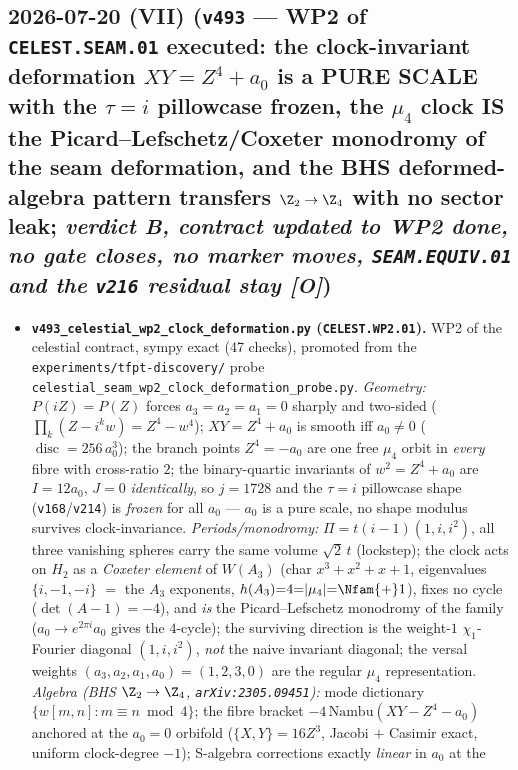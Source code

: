 \documentclass[11pt]{article}
\providecommand{\mO}{\textbf{[O]}}\providecommand{\mX}{\textbf{[X]}}
\begin{document}
\subsection*{2026-07-20 (VII) (\texttt{v493} --- WP2 of \texttt{CELEST.SEAM.01} executed: the clock-invariant deformation $XY{=}Z^4{+}a_0$ is a PURE SCALE with the $\tau{=}i$ pillowcase frozen, the $\mu_4$ clock IS the Picard--Lefschetz/Coxeter monodromy of the seam deformation, and the BHS deformed-algebra pattern transfers $\Z_2\to\Z_4$ with no sector leak; \emph{verdict B, contract updated to WP2 done, no gate closes, no marker moves, \texttt{SEAM.EQUIV.01} and the \texttt{v216} residual stay \mO})}
\begin{itemize}[leftmargin=1.5em]
\item \textbf{\texttt{v493\_celestial\_wp2\_clock\_deformation.py} (\texttt{CELEST.WP2.01}).} WP2 of the
celestial contract, sympy exact (47 checks), promoted from the \texttt{experiments/tfpt-discovery/}
probe \texttt{celestial\_seam\_wp2\_clock\_deformation\_probe.py}. \emph{Geometry:}
$P(iZ){=}P(Z)$ forces $a_3{=}a_2{=}a_1{=}0$ sharply and two-sided
($\prod_k(Z-i^kw)=Z^4-w^4$); $XY{=}Z^4{+}a_0$ is smooth iff $a_0{\neq}0$
($\operatorname{disc}=256\,a_0^3$); the branch points $Z^4{=}{-}a_0$ are one free $\mu_4$ orbit in
\emph{every} fibre with cross-ratio $2$; the binary-quartic invariants of $w^2{=}Z^4{+}a_0$ are $I{=}12a_0$,
$J{=}0$ \emph{identically}, so $j{=}1728$ and the $\tau{=}i$ pillowcase shape
(\texttt{v168}/\texttt{v214}) is \emph{frozen} for all $a_0$ --- $a_0$ is a pure scale, no shape modulus
survives clock-invariance. \emph{Periods/monodromy:} $\Pi=t(i{-}1)(1,i,i^2)$, all three vanishing spheres
carry the same volume $\sqrt2\,t$ (lockstep); the clock acts on $H_2$ as a \emph{Coxeter element} of
$W(A_3)$ (char $x^3{+}x^2{+}x{+}1$, eigenvalues $\{i,-1,-i\}$ $=$ the $A_3$ exponents,
$h(A_3){=}4{=}|\mu_4|{=}\Nfam{+}1$), fixes no cycle ($\det(A{-}1){=}{-}4$), and \emph{is} the
Picard--Lefschetz monodromy of the family ($a_0\to e^{2\pi i}a_0$ gives the $4$-cycle); the surviving
direction is the weight-$1$ $\chi_1$-Fourier diagonal $(1,i,i^2)$, \emph{not} the naive invariant diagonal;
the versal weights $(a_3,a_2,a_1,a_0)=(1,2,3,0)$ are the regular $\mu_4$ representation. \emph{Algebra
(BHS $\Z_2\to\Z_4$, \texttt{arXiv:2305.09451}):} mode dictionary $\{w[m,n]:m{\equiv}n\bmod4\}$; the fibre
bracket $-4\,\mathrm{Nambu}(XY{-}Z^4{-}a_0)$ anchored at the $a_0{=}0$ orbifold ($\{X,Y\}{=}16Z^3$, Jacobi
$+$ Casimir exact, uniform clock-degree $-1$); S-algebra corrections exactly \emph{linear} in $a_0$ at the

\end{itemize}
\end{document}
